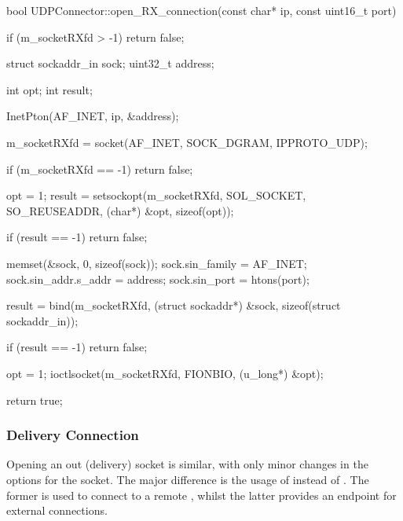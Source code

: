 \begin{codelist}{1}
bool UDPConnector::open_RX_connection(const char* ip, const uint16_t port) {
    if (m_socketRXfd > -1)
        return false;

    struct sockaddr_in sock;
    uint32_t address;

    int opt;
    int result;

	InetPton(AF_INET, ip, &address);

    m_socketRXfd = socket(AF_INET, SOCK_DGRAM, IPPROTO_UDP);

    if (m_socketRXfd == -1)
        return false;

    opt = 1;
    result = setsockopt(m_socketRXfd, SOL_SOCKET, SO_REUSEADDR, (char*) &opt, sizeof(opt));

    if (result == -1)
        return false;

    memset(&sock, 0, sizeof(sock));
    sock.sin_family      = AF_INET;
    sock.sin_addr.s_addr = address;
    sock.sin_port        = htons(port);

    result = bind(m_socketRXfd, (struct sockaddr*) &sock, sizeof(struct sockaddr_in));

    if (result == -1)
        return false;

    opt = 1;
	ioctlsocket(m_socketRXfd, FIONBIO, (u_long*) &opt);

    return true;
}
\end{codelist}

\subsubsection{Delivery Connection}

Opening an out (delivery) socket is similar, with only minor changes in the options for the socket. The major difference is the usage of  instead of . The former is used to connect to a remote , whilst the latter provides an endpoint for external connections.

